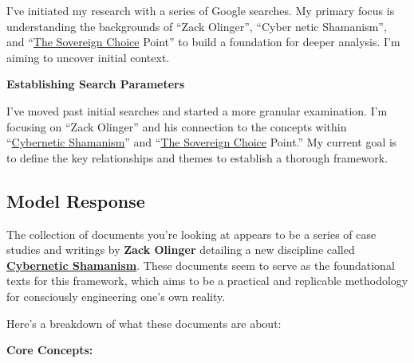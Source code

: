 \documentclass{article}
\begin{document}
I've initiated my research with a series of Google searches. My primary focus is understanding the backgrounds of ``Zack Olinger'', ``Cyber netic Shamanism'', and ``\hyperlink{gloss:sovereign_choice}{The Sovereign Choice} Point'' to build a foundation for deeper analysis. I'm aiming to uncover initial context.

\textbf{Establishing Search Parameters}

I've moved past initial searches and started a more granular examination. I'm focusing on ``Zack Olinger'' and his connection to the concepts within ``\hyperlink{gloss:cybernetic_shamanism}{Cybernetic Shamanism}'' and ``\hyperlink{gloss:sovereign_choice}{The Sovereign Choice} Point.'' My current goal is to define the key relationships and themes to establish a thorough framework.

\subsection*{Model Response}\label{model-response}

The collection of documents you're looking at appears to be a series of case studies and writings by \textbf{Zack Olinger} detailing a new discipline called \textbf{\hyperlink{gloss:cybernetic_shamanism}{Cybernetic Shamanism}}. These documents seem to serve as the foundational texts for this framework, which aims to be a practical and replicable methodology for consciously engineering one's own reality.

Here's a breakdown of what these documents are about:

\textbf{Core Concepts:}
\end{document}
